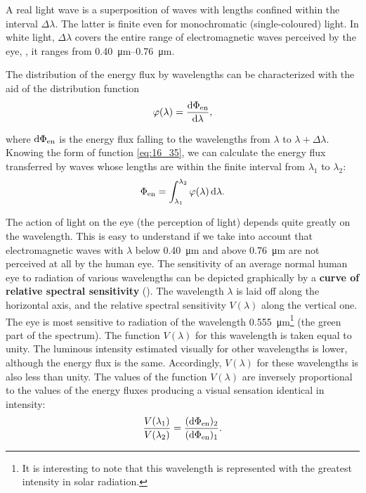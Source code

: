 A real light wave is a superposition of waves with lengths confined within the interval $\Delta{\lambda}$.
The latter is finite even for monochromatic (single-coloured) light.
In white light, $\Delta{\lambda}$ covers the entire range of electromagnetic waves perceived by the eye, \ie, it ranges from \SIrange{0.40}{0.76}{\micro\metre}.

The distribution of the energy flux by wavelengths can be characterized with the aid of the distribution function
\begin{equation}\label{eq:16_35}
    \varphi(\lambda) = \dfrac{\mathrm{d}\Phi_{\text{en}}}{\mathrm{d}\lambda},
\end{equation}

\noindent
where $\mathrm{d}\Phi_{\text{en}}$ is the energy flux falling to the wavelengths from $\lambda$ to $\lambda+\Delta{\lambda}$.
Knowing the form of function \eqref{eq:16_35}, we can calculate the energy flux transferred by waves whose lengths are within the finite interval from $\lambda_1$ to $\lambda_2$:
\begin{equation}\label{eq:16_36}
    \Phi_{\text{en}} = \int_{\lambda_1}^{\lambda_2} \varphi(\lambda)\, \mathrm{d}\lambda.
\end{equation}

\noindent
The action of light on the eye (the perception of light) depends quite greatly on the wavelength.
This is easy to understand if we take into account that electromagnetic waves with $\lambda$ below \SI{0.40}{\micro\metre} and above \SI{0.76}{\micro\metre} are not perceived at all by the human eye.
The sensitivity of an average normal human eye to radiation of various wavelengths can be depicted graphically by a \textbf{curve of relative spectral sensitivity} ().
The wavelength $\lambda$ is laid off along the horizontal axis, and the relative spectral sensitivity $V(\lambda)$ along the vertical one.
The eye is most sensitive to radiation of the wavelength \SI{0.555}{\micro\metre}\footnote{It is interesting to note that this wavelength is represented with the greatest intensity in solar radiation.} (the green part of the spectrum).
The function $V(\lambda)$ for this wavelength is taken equal to unity.
The luminous intensity estimated visually for other wavelengths is lower, although the energy flux is the same.
Accordingly, $V(\lambda)$ for these wavelengths is also less than unity.
The values of the function $V(\lambda)$ are inversely proportional to the values of the energy fluxes producing a visual sensation identical in intensity:
\begin{equation*}
    \frac{V(\lambda_1)}{V(\lambda_2)} = \frac{(\mathrm{d}\Phi_{\text{en}})_2}{(\mathrm{d}\Phi_{\text{en}})_1}.
\end{equation*}

